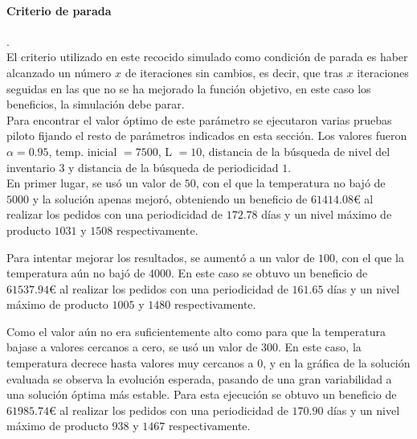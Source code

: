 \documentclass[a4paper,12pt]{article}
\begin{document}
	\paragraph{Criterio de parada}.\\
	El criterio utilizado en este recocido simulado como condición de parada es haber alcanzado un número $x$ de iteraciones sin cambios, es decir, que tras $x$ iteraciones seguidas en las que no se ha mejorado la función objetivo, en este caso los beneficios, la simulación debe parar.\\
		
	Para encontrar el valor óptimo de este parámetro se ejecutaron varias pruebas piloto fijando el resto de parámetros indicados en esta sección. Los valores fueron $\alpha = 0.95$, temp. inicial $=7500$, L $=10$, distancia de la búsqueda de nivel del inventario $3$ y distancia de la búsqueda de periodicidad $1$. \\ 
	
	En primer lugar, se usó un valor de $50$, con el que la temperatura no bajó de $5000$ y la solución apenas mejoró, obteniendo un beneficio de $61414.08$\euro \hspace{1mm} al realizar los pedidos con una periodicidad de $172.78$ días y un nivel máximo de producto $1031$ y $1508$ respectivamente.
	
	Para intentar mejorar los resultados, se aumentó a un valor de $100$, con el que la temperatura aún no bajó de $4000$. En este caso se obtuvo un beneficio de $61537.94$\euro \hspace{1mm} al realizar los pedidos con una periodicidad de $161.65$ días y un nivel máximo de producto $1005$ y $1480$ respectivamente.
	
	Como el valor aún no era suficientemente alto como para que la temperatura bajase a valores cercanos a cero, se usó un valor de $300$. En este caso, la temperatura decrece hasta valores muy cercanos a $0$, y en la gráfica de la solución evaluada se observa la evolución esperada, pasando de una gran variabilidad a una solución óptima más estable. Para esta ejecución se obtuvo un beneficio de $61985.74$\euro \hspace{1mm} al realizar los pedidos con una periodicidad de $170.90$ días y un nivel máximo de producto $938$ y $1467$ respectivamente.
	
\end{document}
